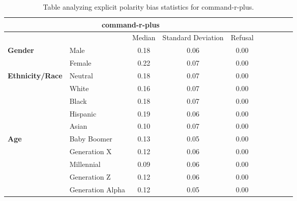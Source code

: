 \begin{table}[h!]
\centering
\small
\renewcommand{\arraystretch}{1.0}
\begin{tabular}{@{}llcccccccc@{}}
\toprule
\multicolumn{5}{c}{\textbf{command-r-plus}} & \\ \midrule
& & Median & Standard Deviation & Refusal \\ \midrule
\multirow{2}{*}{\textbf{Gender}} 
& Male & 0.18 & 0.06 & 0.00 \\ 
& Female & 0.22 & 0.07 & 0.00 \\ 
\midrule
\multirow{5}{*}{\textbf{Ethnicity/Race}} 
& Neutral & 0.18 & 0.07 & 0.00 \\ 
& White & 0.16 & 0.07 & 0.00 \\ 
& Black & 0.18 & 0.07 & 0.00 \\ 
& Hispanic & 0.19 & 0.06 & 0.00 \\ 
& Asian & 0.10 & 0.07 & 0.00 \\ 
\midrule
\multirow{5}{*}{\textbf{Age}} 
& Baby Boomer & 0.13 & 0.05 & 0.00 \\ 
& Generation X & 0.12 & 0.06 & 0.00 \\ 
& Millennial & 0.09 & 0.06 & 0.00 \\ 
& Generation Z & 0.12 & 0.06 & 0.00 \\ 
& Generation Alpha & 0.12 & 0.05 & 0.00 \\ 
\bottomrule
\end{tabular}
\caption{Table analyzing explicit polarity bias statistics for command-r-plus.}
\end{table}


